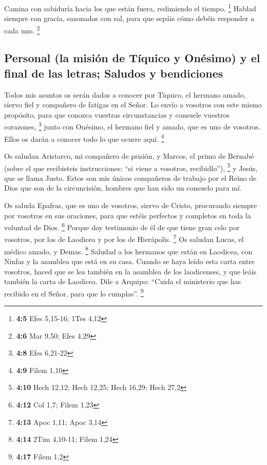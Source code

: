 \begin{paracol}{2}
 Camina con sabiduría hacia los que están fuera,
redimiendo el tiempo. \footnote{\textbf{4:5} Efes 5,15-16; 1Tes 4,12}
 Hablad siempre con gracia, sazonados con sal, para que
sepáis cómo debéis responder a cada uno. \footnote{\textbf{4:6} Mar
  9,50; Efes 4,29}

\hypertarget{personal-la-misiuxf3n-de-tuxedquico-y-onuxe9simo-y-el-final-de-las-letras-saludos-y-bendiciones}{%
\subsection{Personal (la misión de Tíquico y Onésimo) y el final de las
letras; Saludos y
bendiciones}\label{personal-la-misiuxf3n-de-tuxedquico-y-onuxe9simo-y-el-final-de-las-letras-saludos-y-bendiciones}}

 Todos mis asuntos os serán dados a conocer por Tíquico,
el hermano amado, siervo fiel y compañero de fatigas en el Señor.
 Lo envío a vosotros con este mismo propósito, para que
conozca vuestras circunstancias y consuele vuestros corazones,
\footnote{\textbf{4:8} Efes 6,21-22}  junto con Onésimo,
el hermano fiel y amado, que es uno de vosotros. Ellos os darán a
conocer todo lo que ocurre aquí. \footnote{\textbf{4:9} Filem 1,10}

 Os saludan Aristarco, mi compañero de prisión, y Marcos,
el primo de Bernabé (sobre el que recibisteis instrucciones: ``si viene
a vosotros, recibidlo''), \footnote{\textbf{4:10} Hech 12,12; Hech
  12,25; Hech 16,29; Hech 27,2}  y Jesús, que se llama
Justo. Estos son mis únicos compañeros de trabajo por el Reino de Dios
que son de la circuncisión, hombres que han sido un consuelo para mí.

 Os saluda Epafras, que es uno de vosotros, siervo de
Cristo, procurando siempre por vosotros en sus oraciones, para que
estéis perfectos y completos en toda la voluntad de Dios. \footnote{\textbf{4:12}
  Col 1,7; Filem 1,23}  Porque doy testimonio de él de
que tiene gran celo por vosotros, por los de Laodicea y por los de
Hierápolis. \footnote{\textbf{4:13} Apoc 1,11; Apoc 3,14}
 Os saludan Lucas, el médico amado, y Demas. \footnote{\textbf{4:14}
  2Tim 4,10-11; Filem 1,24}  Saludad a los hermanos que
están en Laodicea, con Ninfas y la asamblea que está en su casa.
 Cuando se haya leído esta carta entre vosotros, haced
que se lea también en la asamblea de los laodicenses, y que leáis
también la carta de Laodicea.  Dile a Arquipo: ``Cuida el
ministerio que has recibido en el Señor, para que lo cumplas''.
\footnote{\textbf{4:17} Filem 1,2}


\end{paracol}
